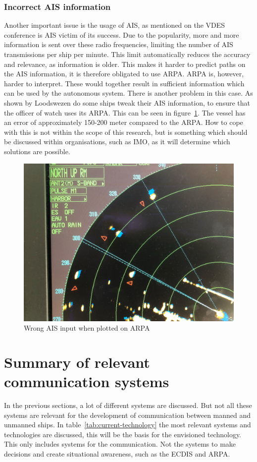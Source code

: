 \subsubsection{Incorrect AIS information}
Another important issue is the usage of AIS, as mentioned on the \acf{VDES} conference is AIS victim of its success. Due to the popularity, more and more information is sent over these radio frequencies, limiting the number of AIS transmissions per ship per minute. This limit automatically reduces the accuracy and relevance, as information is older. This makes it harder to predict paths on the AIS information, it is therefore obligated to use \ac{ARPA}. \ac{ARPA} is, however, harder to interpret. These would together result in sufficient information which can be used by the autonomous system.
There is another problem in this case. As shown by Loodswezen do some ships tweak their AIS information, to ensure that the officer of watch uses its \ac{ARPA}. This can be seen in figure~\ref{fig:wrong-AIS}. The vessel has an error of approximately 150-200 meter compared to the \ac{ARPA}. How to cope with this is not within the scope of this research, but is something which should be discussed within organisations, such as \acf{IMO}, as it will determine which solutions are possible.

\begin{figure}[bhp]
	\centering
	\includegraphics[width=.9\textwidth]{ais1.jpg}
	\caption{Wrong AIS input when plotted on ARPA}
	\label{fig:wrong-AIS}
\end{figure}
\newpage

\section{Summary of relevant communication systems}
\label{sec:relevant-systems}
In the previous sections, a lot of different systems are discussed. But not all these systems are relevant for the development of communication between manned and unmanned ships. In table~\ref{tab:current-technology} the most relevant systems and technologies are discussed, this will be the basis for the envisioned technology.
This only includes systems for the communication. Not the systems to make decisions and create situational awareness, such as the ECDIS and ARPA.

